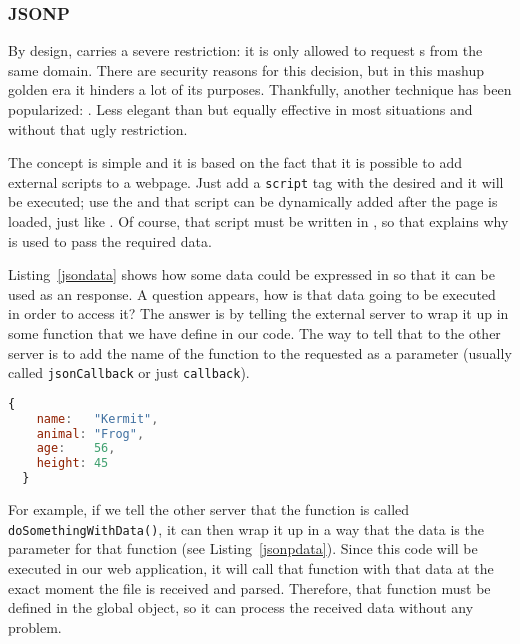 
\subsubsection{JSONP} %
\label{ssub:jsonp}

By design,  carries a severe restriction: it is only allowed to request s from the same domain.
There are security reasons for this decision, but in this mashup golden era it hinders a lot of its purposes.
Thankfully, another technique has been popularized: .
Less elegant than  but equally effective in most situations and without that ugly restriction.

The concept is simple and it is based on the fact that it is possible to add external scripts to a webpage.
Just add a \texttt{script} tag with the desired  and it will be executed; use the  and that script can be dynamically added after the page is loaded, just like .
Of course, that script must be written in , so that explains why   is used to pass the required data.

Listing~\ref{jsondata} shows how some data could be expressed in  so that it can be used as an  response.
A question appears, how is that data going to be executed in order to access it?
The answer is by telling the external server to wrap it up in some function that we have define in our  code.
The way to tell that to the other server is to add the name of the function to the requested  as a parameter (usually called \texttt{jsonCallback} or just \texttt{callback}).

\begin{lstlisting}[language=JavaScript,label=jsondata,caption=Some JSON data]
  {
    name:   "Kermit",
    animal: "Frog",
    age:    56,
    height: 45
  }
\end{lstlisting}

For example, if we tell the other server that the function is called \texttt{doSomethingWithData()}, it can then wrap it up in a way that the data is the parameter for that function (see Listing~\ref{jsonpdata}).
Since this code will be executed in our web application, it will call that function with that data at the exact moment the file is received and parsed.
Therefore, that function must be defined in the global object, so it can process the received data without any problem.

